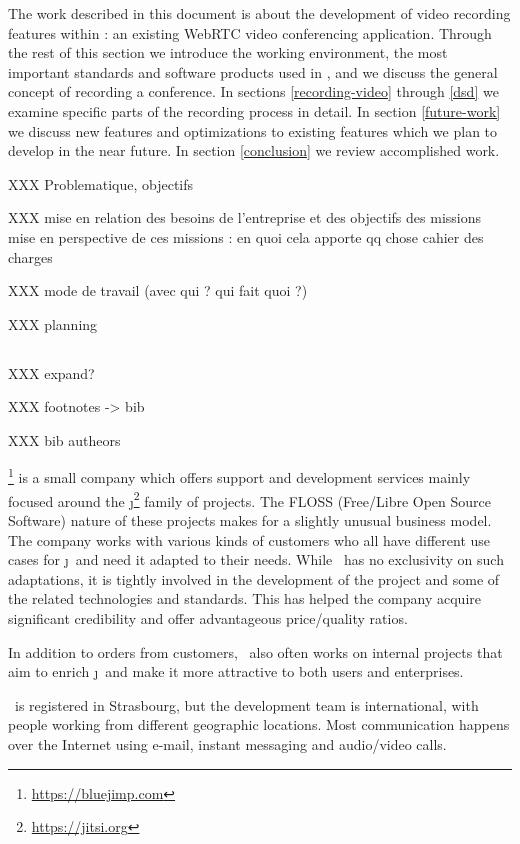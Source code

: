 \documentclass[twoside,openright,a4paper,12pt,english]{article}
\begin{document}
The work described in this document is about the development of video recording features
within \jm: an existing WebRTC video conferencing application. Through
the rest of this section we introduce the working environment, the most
important standards and software products used in \jm, and we discuss the
general concept of recording a conference. In sections \ref{recording-video} through \ref{dsd} we examine specific
parts of the recording process in detail. In section \ref{future-work} we
discuss new features and optimizations to existing features which we plan to
develop in the near future. In section \ref{conclusion} we review accomplished work.


XXX Problematique, objectifs

XXX mise en relation des besoins de l’entreprise et des objectifs des missions mise en perspective de ces missions : en quoi cela apporte qq chose cahier des charges

XXX mode de travail (avec qui ? qui fait quoi ?)

XXX planning
\subsection{\bj}
XXX expand?

XXX footnotes -> bib

XXX bib autheors

\bj\footnote{\url{https://bluejimp.com}} is a small company which
offers support and development services mainly focused around the
\j\footnote{\url{https://jitsi.org}}
 family of projects. The FLOSS (Free/Libre Open Source Software)
nature of these projects makes for a slightly unusual business model. The
company works with various kinds of customers who all have different use cases
for \j\ and need it adapted to their needs. While \bj\ has no exclusivity
on such adaptations, it is tightly involved in the development of the project
and some of the related technologies and standards. This has helped the company
acquire significant credibility and offer advantageous price/quality ratios.

In addition to orders from customers, \bj\ also often works on internal projects
that aim to enrich \j\ and make it more attractive to both users and
enterprises. 

\bj\ is registered in Strasbourg, but the development team is international,
with people working from different geographic locations. Most communication happens over
the Internet using e-mail, instant messaging and audio/video calls.
\end{document}
